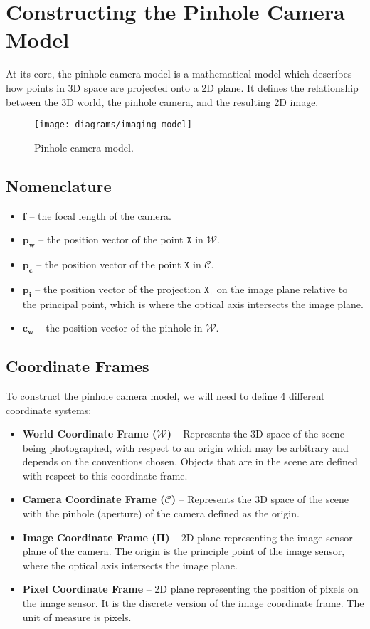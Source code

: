 \section{Constructing the Pinhole Camera Model}

At its core, the pinhole camera model is a mathematical model which describes how points in 3D space are projected onto a 2D plane. It defines the relationship between the 3D world, the pinhole camera, and the resulting 2D image.
\begin{figure}[H]
    \centering
    \texttt{[image: diagrams/imaging\_model]}
    \caption{Pinhole camera model.}
\end{figure}

\subsection{Nomenclature}
\begin{itemize}[leftmargin=!, itemindent=-4ex]
    \item $\boldsymbol{f}$ -- the focal length of the camera.
    \item $\boldsymbol{p_w}$ -- the position vector of the point $\mathtt{X}$ in $\mathcal{W}$.
    \item $\boldsymbol{p_c}$ -- the position vector of the point $\mathtt{X}$ in $\mathcal{C}$.
    \item $\boldsymbol{p_i}$ -- the position vector of the projection $\mathtt{X_i}$ on the image plane relative to the principal point, which is where the optical axis intersects the image plane.
    \item $\boldsymbol{c_w}$ -- the position vector of the pinhole in $\mathcal{W}$.
\end{itemize}

\subsection{Coordinate Frames}
To construct the pinhole camera model, we will need to define 4 different coordinate systems:
\begin{itemize}[leftmargin=!, itemindent=-4ex]
    \item\textbf{World Coordinate Frame ($\boldsymbol{\mathcal{W}}$)} -- Represents the 3D space of the scene being photographed, with respect to an origin which may be arbitrary and depends on the conventions chosen. Objects that are in the scene are defined with respect to this coordinate frame.
    \item\textbf{Camera Coordinate Frame ($\boldsymbol{\mathcal{C}}$)} -- Represents the 3D space of the scene with the pinhole (aperture) of the camera defined as the origin.
    \item\textbf{Image Coordinate Frame ($\boldsymbol{\Pi}$)} -- 2D plane representing the image sensor plane of the camera. The origin is the principle point of the image sensor, where the optical axis intersects the image plane.
    \item\textbf{Pixel Coordinate Frame} -- 2D plane representing the position of pixels on the image sensor. It is the discrete version of the image coordinate frame. The unit of measure is pixels.
\end{itemize}

